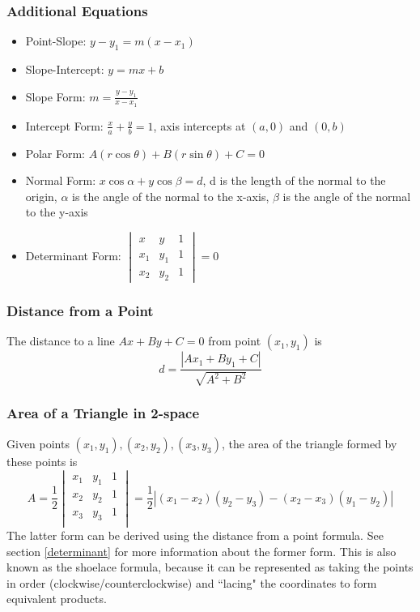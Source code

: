 \documentclass{article}
\begin{document}
\subsubsection{Additional Equations}
\begin{itemize}
    \item Point-Slope: $y-y_1 = m(x-x_1)$
    \item Slope-Intercept: $y=mx+b$
    \item Slope Form: $m=\frac{y-y_1}{x-x_1}$
    \item Intercept Form: $\frac{x}{a} + \frac{y}{b} = 1$, axis intercepts at $(a, 0)$ and $(0, b)$
    \item Polar Form: $A\left(r\cos{\theta}\right)+B\left(r\sin{\theta}\right) + C = 0$
    \item Normal Form: $x\cos{\alpha} + y\cos{\beta} = d$, d is the length of the normal to the origin, $\alpha$ is the angle of the normal to the x-axis, $\beta$ is the angle of the normal to the y-axis
    \item Determinant Form: $\begin{vmatrix}
x & y & 1\\
x_1 & y_1 & 1 \\
x_2 & y_2 & 1
\end{vmatrix}= 0$
\end{itemize}

\subsubsection{Distance from a Point}
The distance to a line $Ax+By+C=0$ from point $(x_1, y_1)$ is
$$d=\frac{\left|Ax_1 + By_1 + C\right|}{\sqrt{A^2+B^2}}$$

\subsubsection{Area of a Triangle in 2-space}
Given points $(x_1, y_1), (x_2, y_2), (x_3, y_3)$, the area of the triangle formed by these points is
$$A = \frac{1}{2}\begin{vmatrix}
    x_1 & y_1 & 1 \\
    x_2 & y_2 & 1 \\
    x_3 & y_3 & 1 \\
\end{vmatrix} = \frac{1}{2}\left|(x_1-x_2)(y_2-y_3) - (x_2 - x_3)(y_1 - y_2)\right|$$
The latter form can be derived using the distance from a point formula. See section \ref{determinant} for more information about the former form.
This is also known as the shoelace formula, because it can be represented as taking the points in order (clockwise/counterclockwise) and ``lacing" the coordinates to form equivalent products.
\end{document}
